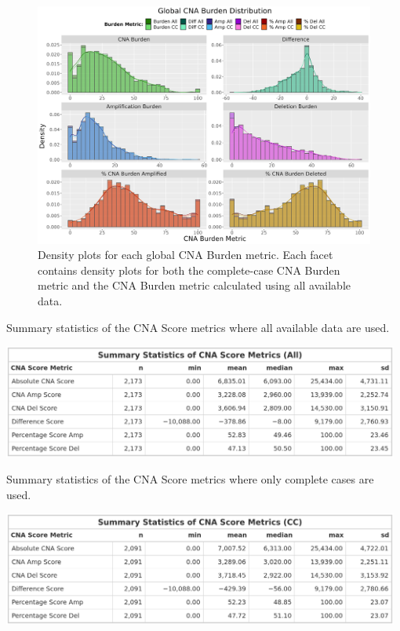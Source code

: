 \begin{figure}[!htb]
\center
\includegraphics[width = 1\textwidth]{../figures/Chapter_2/Global_CNA_Burden_Comparative_Density.png}
\caption[Density plots for each global CNA Burden metric.]{Density plots for each global CNA Burden metric. Each facet contains density plots for both the complete-case CNA Burden metric and the CNA Burden metric calculated using all available data.}
\label{fig:Burden_Comp_Dense}
\end{figure}

\begin{table}[!htb]
\center
\caption[Summary statistics of the CNA Score metrics where all available data are used.]{Summary statistics of the CNA Score metrics where all available data are used.}
\includegraphics[width = 0.98\textwidth]{../tables/Chapter_2/Global_CNA_Score_Metric_All_Summary.png}
\label{tab:Score_All}
\end{table}

\begin{table}[!htb]
\center
\caption[Summary statistics of the CNA Score metrics where only complete cases are used.]{Summary statistics of the CNA Score metrics where only complete cases are used.}
\includegraphics[width = 0.98\textwidth]{../tables/Chapter_2/Global_CNA_Score_Metric_CCA_Summary.png}
\label{tab:Score_CCA}
\end{table}

